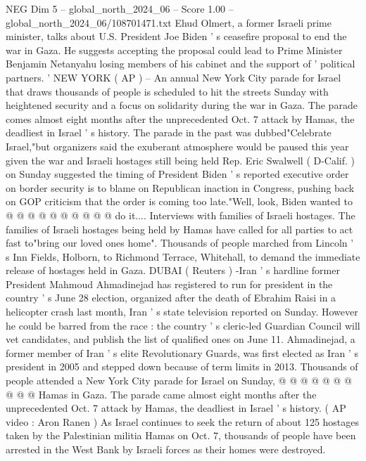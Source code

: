 \begin{textsample}{NEG Dim 5 – global\_north\_2024\_06 – Score 1.00 – global\_north\_2024\_06/108701471.txt}  \label{ex:f5_neg_137}
Ehud Olmert, a former Israeli prime minister, talks about U.S.
President Joe Biden ' s ceasefire proposal to end the war in Gaza.
He suggests accepting the proposal could lead to Prime Minister Benjamin Netanyahu losing members of his cabinet and the support of ' political partners. ' NEW YORK ( AP ) -- An annual New York City parade for Israel that draws thousands of people is scheduled to hit the streets Sunday with heightened security and a focus on solidarity during the war in Gaza.
The parade comes almost eight months after the unprecedented Oct. 7 attack by Hamas, the deadliest in Israel ' s history.
The parade in the past was dubbed"Celebrate Israel,"but organizers said the exuberant atmosphere would be paused this year given the war and Israeli hostages still being held Rep.
Eric Swalwell ( D-Calif. ) on Sunday suggested the timing of President Biden ' s reported executive order on border security is to blame on Republican inaction in Congress, pushing back on GOP criticism that the order is coming too late."Well, look, Biden wanted to @ @ @ @ @ @ @ @ @ @ do it....
Interviews with families of Israeli hostages.
The families of Israeli hostages being held by Hamas have called for all parties to act fast to"bring our loved ones home".
Thousands of people marched from Lincoln ' s Inn Fields, Holborn, to Richmond Terrace, Whitehall, to demand the immediate release of hostages held in Gaza.
DUBAI ( Reuters ) -Iran ' s hardline former President Mahmoud Ahmadinejad has registered to run for president in the country ' s June 28 election, organized after the death of Ebrahim Raisi in a helicopter crash last month, Iran ' s state television reported on Sunday.
However he could be barred from the race : the country ' s cleric-led Guardian Council will vet candidates, and publish the list of qualified ones on June 11.
Ahmadinejad, a former member of Iran ' s elite Revolutionary Guards, was first elected as Iran ' s president in 2005 and stepped down because of term limits in 2013.
Thousands of people attended a New York City parade for Israel on Sunday, @ @ @ @ @ @ @ @ @ @ Hamas in Gaza.
The parade came almost eight months after the unprecedented Oct. 7 attack by Hamas, the deadliest in Israel ' s history. ( AP video : Aron Ranen ) As Israel continues to seek the return of about 125 hostages taken by the Palestinian militia Hamas on Oct. 7, thousands of people have been arrested in the West Bank by Israeli forces as their homes were destroyed.

\end{textsample}
